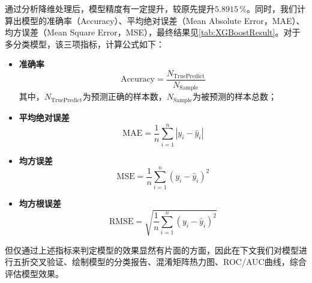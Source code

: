 \documentclass{MathorCupModeling}
\begin{document}
	通过分析降维处理后，模型精度有一定提升，较原先提升$5.8915\,\%$。同时，我们计算出模型的准确率（Accuracy）、平均绝对误差（Mean Absolute Error，MAE）、均方误差（Mean Square Error，MSE），最终结果见\textcolor{blue}{\cref{tab:XGBoostResult}}。对于多分类模型，该三项指标，计算公式如下：
\begin{itemize}
	\item \textbf{准确率}
		\begin{equation}
		\mathrm{Accuracy}=\frac{N_{\mathrm{TruePredict}}}{N_{\mathrm{Sample}}} \label{Accuracy}
		\end{equation}
	其中，$N_{\mathrm{TruePredict}}$为预测正确的样本数，$N_{\mathrm{Sample}}$为被预测的样本总数；
	\item \textbf{平均绝对误差}
		\begin{equation}
		\mathrm{MAE}=\frac{1}{n}\sum_{i=1}^{n}\left|y_{i}-\hat{y}_{i}\right| \label{MAE}
		\end{equation}
	\item \textbf{均方误差}
		\begin{equation}
		\mathrm{MSE}=\frac{1}{n}\sum_{i=1}^{n}\left(y_{i}-\hat{y}_{i}\right)^{2} \label{MSE}
		\end{equation}
	\item \textbf{均方根误差}
		\begin{equation}
		\mathrm{RMSE}=\sqrt{\frac{1}{n}\sum_{i=1}^{n}\left(y_{i}-\hat{y}_{i}\right)^{2}} \label{RMSE}
		\end{equation}
\end{itemize}

\begin{table}[H]
	\centering
	\caption{XGBoost模型最终效果}
	\label{tab:XGBoostResult}
\end{table}

但仅通过上述指标来判定模型的效果显然有片面的方面，因此在下文我们对模型进行五折交叉验证、绘制模型的分类报告、混淆矩阵热力图、ROC/AUC曲线，综合评估模型效果。
\end{document}
